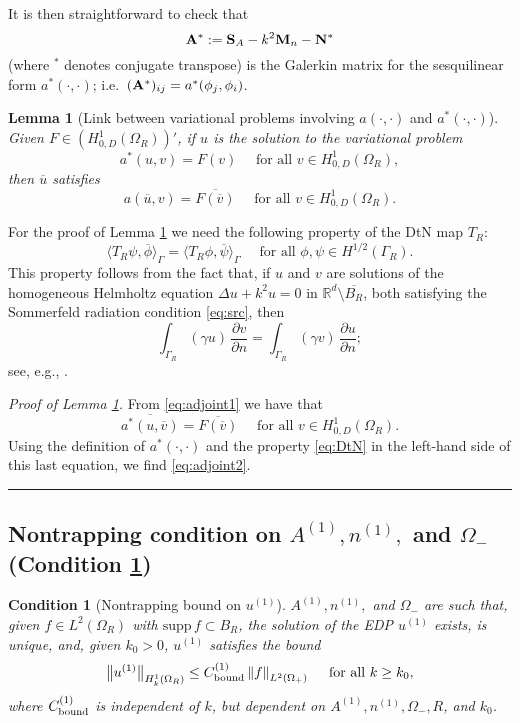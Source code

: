 \documentclass[10pt]{article}%
\newenvironment{proof}[1][Proof]{\noindent \emph{#1.} }
{\hfill \ \rule{0.5em}{0.5em}}
\newtheorem{lemma}[theorem]{Lemma}
\newtheorem{condition}[theorem]{Condition}
\numberwithin{equation}{section}
\newcommand{\beq}{\begin{equation}}
\newcommand{\eeq}{\end{equation}}
\newcommand{\beqs}{\begin{equation*}}
\newcommand{\eeqs}{\end{equation*}}
\newcommand{\bpf}{\begin{proof}}
\newcommand{\epf}{\end{proof}}
\newcommand{\ble}{\begin{lemma}}
\newcommand{\ele}{\end{lemma}}
\newcommand{\noi}{\noindent}
\newcommand{\supp}{\mathrm{supp}}
\newcommand{\Rea}{\mathbb{R}}
\newcommand{\pdiff}[2]{\frac{\partial #1}{\partial #2}}
\newcommand{\Oi}{{\Omega_-}}
\newcommand{\Oe}{{\Omega_+}}
\newcommand{\OR}{{\Omega_R}}
\newcommand{\GR}{{\Gamma_R}}
\newcommand{\HoDk}{{H^1_{0,D}(\domain_R)}}
\newcommand{\HoDkk}{{H^1_{k}(\domain_R)}}
\newcommand*{\N}[1]{\left\|#1\right\|}
\newcommand{\tfa}{\text{ for all }}
\newcommand{\domain}{\Omega}
\newcommand{\matrixA}{{\bf A}}
\newcommand{\matrixS}{{\bf S}}
\newcommand{\matrixM}{{\bf M}}
\newcommand{\matrixN}{{\bf N}}
\newcommand{\coeffAo}{A^{(1)}}
\newcommand{\coeffno}{n^{(1)}}
\begin{document}
\noi It is then straightforward to check that
\beq\label{eq:A*}
\matrixA^* := \matrixS_A -k^2 \matrixM_n - \matrixN^*
\eeq
(where $^*$ denotes conjugate transpose) is the Galerkin matrix for the sesquilinear form $a^*(\cdot,\cdot)$; i.e.~$(\matrixA^*)_{ij} = a^*(\phi_j, \phi_i)$.

\ble[Link between variational problems involving $a(\cdot,\cdot)$ and $a^*(\cdot,\cdot)$]\label{lem:adjoint}
Given $F\in (\HoDk)'$, if $u$ is the solution to the variational problem
\beq\label{eq:adjoint1}
a^*(u,v)= F(v) \quad\tfa v\in H^1_{0,D}(\OR),
\eeq
then $\overline{u}$ satisfies
\beq\label{eq:adjoint2}
a(\overline{u},v)= \overline{F(\overline{v})} \quad\tfa v\in H^1_{0,D}(\OR).
\eeq
\ele

For the proof of Lemma \ref{lem:adjoint} we need the following property of the DtN map $T_R$:
\beq\label{eq:DtN}
\big\langle T_R\psi, \overline{\phi} \big\rangle_\Gamma = \big\langle T_R \phi, \overline{\psi}\big\rangle_\Gamma \quad\tfa \phi,\psi \in H^{1/2}(\GR).
\eeq
This property follows from the fact that, if $u$ and $v$ are solutions of the homogeneous Helmholtz equation $\Delta u +k^2 u=0$ in $\Rea^d\setminus \overline{B_R}$, both satisfying the Sommerfeld radiation condition \eqref{eq:src}, then
\beqs
\int_{\GR} (\gamma u)\, \pdiff{v}{n} = \int_{\GR} (\gamma v)\,\pdiff{u}{n};
\eeqs
see, e.g., \cite[Lemma 6.13]{Sp:15}.

\bpf[Proof of Lemma \ref{lem:adjoint}]
From \eqref{eq:adjoint1} we have that 
\beqs
\overline{a^*(u,\overline{v})}= \overline{F(\overline{v})} \quad\tfa v\in H^1_{0,D}(\OR).
\eeqs
Using the definition of $a^*(\cdot,\cdot)$ and the property \eqref{eq:DtN} in the left-hand side of this last equation, we find \eqref{eq:adjoint2}.
\epf

\subsection{Nontrapping condition on $\coeffAo, \coeffno,$ and $\Oi$ (Condition \ref{cond:1})}\label{sec:cond1}


\begin{condition}[Nontrapping bound on $u^{(1)}$]\label{cond:1}
$\coeffAo, \coeffno,$ and $\Oi$ are such that, given $f\in L^2(\Omega_R)$ with $\supp \, f \subset B_R$, 
the solution of the EDP %
$u^{(1)}$ exists, is unique, and, given $k_0>0$, $u^{(1)}$ satisfies the bound 
\beq\label{eq:bound1}
\big\|u^{(1)}\big\|_{\HoDkk} \leq C^{(1)}_{\rm bound} \N{f}_{L^2(\Oe)} \quad \tfa k\geq k_0,
\eeq
where $C^{(1)}_{\rm bound}$ is independent of $k$, but dependent on $\coeffAo, \coeffno, \Oi, R$, and $k_0$.
\end{condition}
\end{document}
